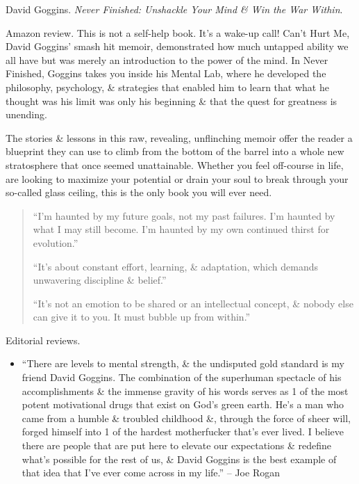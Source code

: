 \documentclass{article}
\begin{document}
\begin{enumerate}
	\item {\sc David Goggins}. {\it Never Finished: Unshackle Your Mind \& Win the War Within}. {}
	
	{\sf Amazon review.} This is not a self-help book. It's a wake-up call! Can't Hurt Me, {\sc David Goggins}' smash hit memoir, demonstrated how much untapped ability we all have but was merely an introduction to the power of the mind. In Never Finished, {\sc Goggins} takes you inside his Mental Lab, where he developed the philosophy, psychology, \& strategies that enabled him to learn that what he thought was his limit was only his beginning \& that the quest for greatness is unending.
	
	The stories \& lessons in this raw, revealing, unflinching memoir offer the reader a blueprint they can use to climb from the bottom of the barrel into a whole new stratosphere that once seemed unattainable. Whether you feel off-course in life, are looking to maximize your potential or drain your soul to break through your so-called glass ceiling, this is the only book you will ever need.
	\begin{quote}
		\item ``I'm haunted by my future goals, not my past failures. I'm haunted by what I may still become. I'm haunted by my own continued thirst for evolution.''
		\item ``It's about constant effort, learning, \& adaptation, which demands unwavering discipline \& belief.''
		\item ``It's not an emotion to be shared or an intellectual concept, \& nobody else can give it to you. It must bubble up from within.''
	\end{quote}
	{\sf Editorial reviews.}
	\begin{itemize}
		\item ``There are levels to mental strength, \& the undisputed gold standard is my friend {\sc David Goggins}. The combination of the superhuman spectacle of his accomplishments \& the immense gravity of his words serves as 1 of the most potent motivational drugs that exist on God's green earth. He's a man who came from a humble \& troubled childhood \&, through the force of sheer will, forged himself into 1 of the hardest motherfucker that's ever lived. I believe there are people that are put here to elevate our expectations \& redefine what's possible for the rest of us, \& {\sc David Goggins} is the best example of that idea that I've ever come across in my life.'' -- {\sc Joe Rogan}

\end{itemize}
\end{enumerate}
\end{document}
